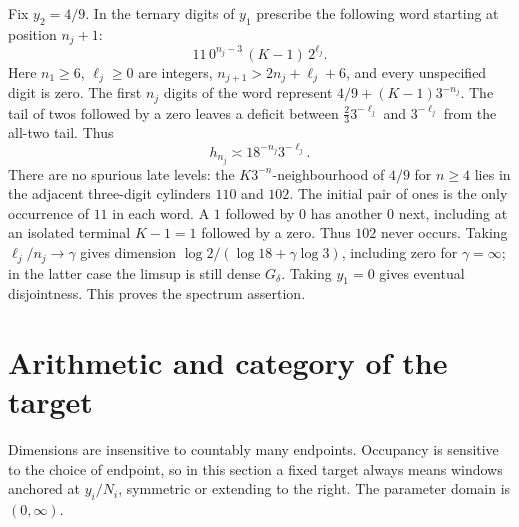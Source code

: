 \documentclass[11pt,reqno,a4paper]{amsart}
\theoremstyle{remark}
\numberwithin{equation}{section}
\begin{document}
Fix \(y_2=4/9\). In the ternary digits of \(y_1\) prescribe the following word starting at position \(n_j+1\):
\[
             11\,0^{n_j-3}\,(K-1)\,2^{\ell_j}.
\]
Here \(n_1\ge6\), \(\ell_j\ge0\) are integers, \(n_{j+1}>2n_j+\ell_j+6\), and every unspecified digit is zero. The first \(n_j\) digits of the word represent \(4/9+(K-1)3^{-n_j}\). The tail of twos followed by a zero leaves a deficit between \(\frac23 3^{-\ell_j}\) and \(3^{-\ell_j}\) from the all-two tail. Thus
\[
             h_{n_j}\asymp18^{-n_j}3^{-\ell_j}.
\]
There are no spurious late levels: the \(K3^{-n}\)-neighbourhood of \(4/9\) for \(n\ge4\) lies in the adjacent three-digit cylinders \(110\) and \(102\). The initial pair of ones is the only occurrence of \(11\) in each word. A \(1\) followed by \(0\) has another \(0\) next, including at an isolated terminal \(K-1=1\) followed by a zero. Thus \(102\) never occurs. Taking \(\ell_j/n_j\to\gamma\) gives dimension \(\log2/(\log18+\gamma\log3)\), including zero for \(\gamma=\infty\); in the latter case the limsup is still dense \(G_\delta\). Taking \(y_1=0\) gives eventual disjointness. This proves the spectrum assertion.

\section{Arithmetic and category of the target}\label{sec:occupancy}
Dimensions are insensitive to countably many endpoints. Occupancy is sensitive to the choice of endpoint, so in this section a fixed target always means windows anchored at \(y_i/N_i\), symmetric or extending to the right. The parameter domain is \((0,\infty)\).
\end{document}
